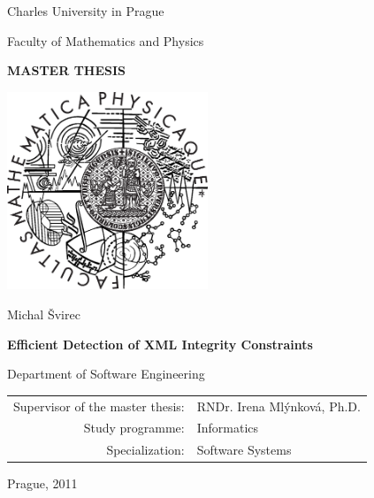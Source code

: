 \documentclass[12pt,a4paper]{report}
\def\mftitle{Efficient Detection of XML Integrity Constraints}
\def\mfthesistype{MASTER THESIS}
\def\mfkatedra{Department of Software Engineering}
\def\mfauthor{Michal Švirec}
\def\mfadvisor{RNDr. Irena Mlýnková, Ph.D.}
\def\mfplacedate{Prague, 2011}
\begin{document}


\pagestyle{empty}
\begin{center}

\large

Charles University in Prague

\medskip

Faculty of Mathematics and Physics

\vfill

{\bf\Large \mfthesistype}

\vfill

\centerline{\mbox{\includegraphics[width=60mm]{logo.eps}}}

\vfill
\vspace{5mm}

{\LARGE \mfauthor}

\vspace{15mm}

{\LARGE\bfseries \mftitle}

\vfill

\mfkatedra

\vfill

\begin{tabular}{rl}

Supervisor of the master thesis: & \mfadvisor \\
\noalign{\vspace{2mm}}
Study programme: & Informatics \\
\noalign{\vspace{2mm}}
Specialization: & Software Systems \\
\end{tabular}

\vfill

\mfplacedate

\end{center}
\end{document}
